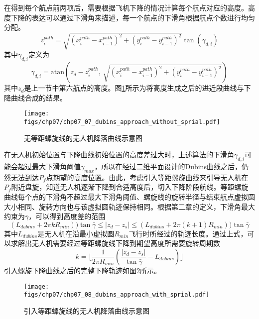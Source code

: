 在得到每个航点前两项后，需要根据飞机下降的情况计算每个航点对应的高度。高度下降的表达可以通过下滑角来描述，每一个航点的下滑角根据航点个数进行均匀分配。
\begin{equation}
z_i^{path} = \sqrt{(x_i^{path}-x_{i-1}^{path})^2+(y_i^{path}-y_{i-1}^{path})^2} \tan (\gamma_{d,i})
\end{equation}
其中$\gamma_{d,i}$定义为
\begin{equation}
\gamma_{d,i} = \text{atan}(z_{d}-z_i^{path}, \  \sqrt{(x_i^{path}-x_{i-1}^{path})^2+(y_i^{path}-y_{i-1}^{path})^2})
\end{equation}
其中$z_d$是上一节中第六航点的高度。图\ref{fig:chp07_07_dubins_approach_without_sprial}所示为将高度生成之后的进近段曲线与下降曲线合成的结果。
\begin{figure}[ht]   
	\centering
	\texttt{[image: figs/chp07/chp07\_07\_dubins\_approach\_without\_sprial.pdf]}
	\caption{无等距螺旋线的无人机降落曲线示意图}
	\label{fig:chp07_07_dubins_approach_without_sprial}
\end{figure}
在无人机初始位置与下降曲线初始位置的高度差过大时，上述算法的下滑角$\gamma_{d,i}$可能会超过最大下滑角阈值$\gamma_{max}$，所以在经过二维平面设计的Dubins曲线之后，仍然无法到达$P_f$点期望的高度位置。由此，考虑引入等距螺旋曲线来引导无人机在$P_f$附近盘旋，知道无人机逐渐下降到合适高度后，切入下降阶段航线。等距螺旋曲线每个点的下滑角不超过最大下滑角阈值、螺旋线的旋转半径与结束航点虚拟圆大小相同、旋转方向也与该虚拟圆轨迹保持相同。根据第二章的定义，下滑角最大约束为$\bar{\gamma}$，可以得到高度差的范围
\begin{equation}
(L_{dubins} + 2\pi k R_{min})) \tan \bar{\gamma} \le |z_d - z_s|\le (L_{dubins} + 2\pi(k+1)R_{min})) \tan \bar{\gamma}
\end{equation}
其中$L_{dubins}$是无人机在沿最小虚拟圆$R_{min}$飞行时所经过的轨迹长度。通过上式，可以求解出无人机需要经过等距螺旋线下降到期望高度所需要旋转周期数
\begin{equation}
k = \lfloor \frac{1}{2 \pi R_{min}} (\frac{|z_d - z_s|}{\tan \bar{\gamma}} - L_{dubins}) \rfloor
\end{equation}
引入螺旋下降曲线之后的完整下降轨迹如图\ref{fig:chp07_08_dubins_approach_with_sprial}所示。
\begin{figure}[ht]   
	\centering
	\texttt{[image: figs/chp07/chp07\_08\_dubins\_approach\_with\_sprial.pdf]}
	\caption{引入等距螺旋线的无人机降落曲线示意图}
	\label{fig:chp07_08_dubins_approach_with_sprial}
\end{figure}



